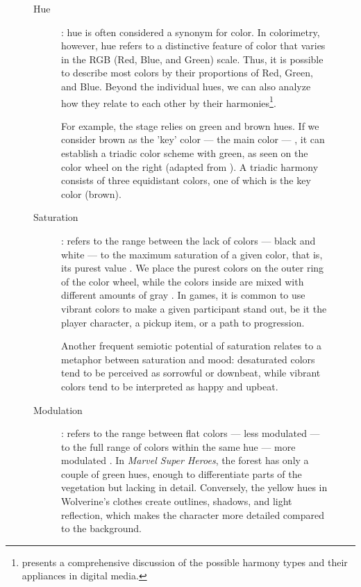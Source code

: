 \documentclass[english]{textolivre}
\begin{document}
\begin{figure}[htbp]
\begin{minipage}[t]{0.47\textwidth}
\label{fig3}
\end{minipage}
\begin{minipage}[t]{\textwidth}
\small
\vspace{2ex}
\begin{description}
    \item[Hue]: hue is often considered a synonym for color. In colorimetry, however, hue refers to a distinctive feature of color that varies in the RGB (Red, Blue, and Green) scale. Thus, it is possible to describe most colors by their proportions of Red, Green, and Blue. Beyond the individual hues, we can also analyze how they relate to each other by their harmonies\footnote{\textcite[p. 86-97]{rhyne_applying_2017} presents a comprehensive discussion of the possible harmony types and their appliances in digital media.}.
    
    For example, the stage relies on green and brown hues. If we consider brown as the 'key' color — the main color — \cite[p.~86]{rhyne_applying_2017}, 
    it can establish a triadic color scheme with green, as seen on the color wheel on the right (adapted from \textcite[p.~96]{rhyne_applying_2017}).
    A triadic harmony consists of three equidistant colors, one of which is the key color (brown).

    \item[Saturation]:  refers to the range between the lack of colors — black and white — to the maximum saturation of a given color, that is, its purest value \cites[p.~167]{van_leeuwen_introducing_2005}[p.~61–2]{rhyne_applying_2017}.
    We place the purest colors on the outer ring of the color wheel, while the colors inside are mixed with different amounts of gray \cite[p. 61]{rhyne_applying_2017}. In games, it is common to use vibrant colors to make a given participant stand out, be it the player character, a pickup item, or a path to progression.
    
    Another frequent semiotic potential of saturation relates to a metaphor \cite[p. 30]{van_leeuwen_introducing_2005} between saturation and mood: desaturated colors tend to be perceived as sorrowful or downbeat, while vibrant colors tend to be interpreted as happy and upbeat.

    \item[Modulation]: refers to the range between flat colors — less modulated — to the full range of colors within the same hue — more modulated \cite[p. 167]{van_leeuwen_introducing_2005}. In \textit{Marvel Super Heroes}, the forest has only a couple of green hues, enough to differentiate parts of the vegetation but lacking in detail. Conversely, the yellow hues in Wolverine’s clothes create outlines, shadows, and light reflection, which makes the character more detailed compared to the background.


\end{description}
\end{minipage}
\end{figure}
\end{document}
